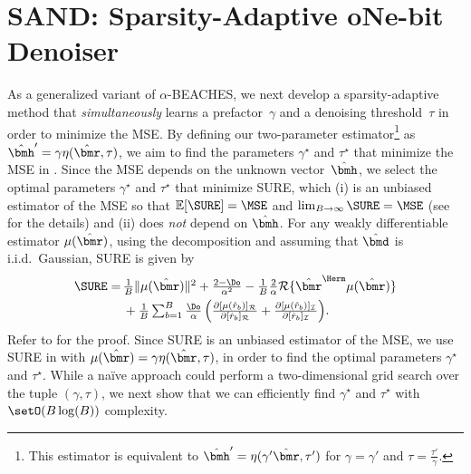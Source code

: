 
\section{SAND: Sparsity-Adaptive oNe-bit Denoiser} \label{sec:SAND}

As a generalized variant of $\alpha$-BEACHES, we next develop a sparsity-adaptive method that \emph{simultaneously} learns a prefactor~$\gamma$ and a denoising threshold~$\tau$ in order to minimize the MSE.
%
By defining our two-parameter estimator\footnote{This estimator is equivalent to $\hhattick = \eta(\gamma'\rhat,\tau')$ for $\gamma = \gamma'$ and $\tau = \frac{\tau'}{\gamma}$.} as $\hhattick = \gamma\eta(\rhat,\tau)$, we aim to find the parameters $\gamma^\star$ and $\tau^\star$ that minimize the MSE in . 
%
Since the MSE depends on the unknown vector~$\hhat$, we select the optimal parameters $\gamma^\star$ and $\tau^\star$ that minimize SURE, which (i) is an unbiased estimator of the MSE so that $\E{\SURE}=\MSE$ and $\lim_{B\to\infty}\SURE = \MSE$ (see \cite{ghods19a} for the details) and (ii) does \emph{not}  depend on $\hhat$. 
%
For any weakly differentiable estimator $\mur$, using the decomposition  and assuming that $\dhat$ is i.i.d.\ Gaussian,  SURE is given by  
\begin{align}
\SURE = \, & \textstyle \frac{1}{B} {\|\mur\|^2}+ \frac{2-\Do}{\alpha^2}  -  \frac{1}{B} {\frac{2}{\alpha}\realpart{{\rhat}^\Herm \mur}} \notag\\
& + \textstyle \frac{1}{B} \sum_{b=1}^B \frac{\Do}{\alpha}\left(\frac{\partial\realindex{\mure{b}}}{\partial\realindex{\rhate{b}}}+\frac{\partial\imagindex{\mure{b}}}{\partial\imagindex{\rhate{b}}}\right)\!.  \label{eq:sure}
\end{align}
Refer to  for the proof.
%
%
Since SURE is an unbiased estimator of the MSE, we use SURE in  with $\mur = \gamma\eta(\rhat,\tau)$, in order to find the optimal parameters $\gamma^\star$ and $\tau^\star$.
%
While a na\"ive approach could perform a two-dimensional grid search over the tuple $(\gamma,\tau)$, we next show that we can efficiently find $\gamma^\star$ and $\tau^\star$ with $\setO(B\log(B))$ complexity.

